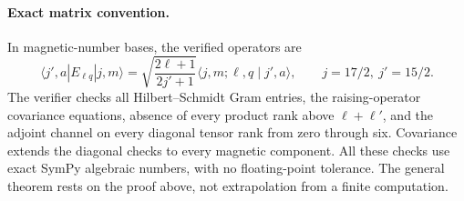 \documentclass[11pt]{article}
\begin{document}
\paragraph{Exact matrix convention.}
In magnetic-number bases, the verified operators are
\[
 \langle j',a|E_{\ell q}|j,m\rangle
 =\sqrt{\frac{2\ell+1}{2j'+1}}
 \langle j,m;\ell,q\mid j',a\rangle,
 \qquad j=17/2,\ j'=15/2.
\]
The verifier checks all Hilbert--Schmidt Gram entries, the raising-operator
covariance equations, absence of every product rank above
$\ell+\ell'$, and the adjoint channel on every diagonal tensor rank from
zero through six. Covariance extends the diagonal checks to every magnetic
component. All these checks use exact SymPy algebraic numbers, with no
floating-point tolerance. The general theorem rests on the proof above,
not extrapolation from a finite computation.
\end{document}
